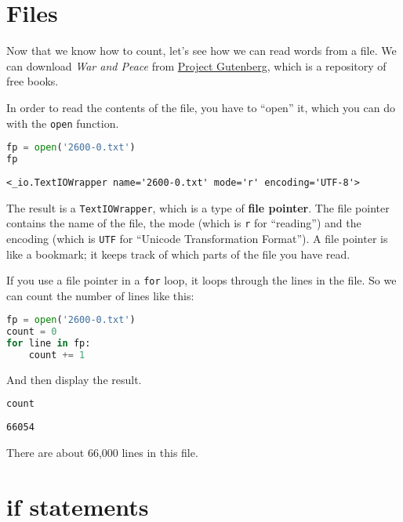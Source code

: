 \hypertarget{files}{%
\section{Files}\label{files}}

Now that we know how to count, let's see how we can read words from a
file. We can download \emph{War and Peace} from
\href{https://www.gutenberg.org}{Project Gutenberg}, which is a
repository of free books.

In order to read the contents of the file, you have to ``open'' it,
which you can do with the \passthrough{\lstinline!open!} function.

\begin{lstlisting}[language=Python,style=source]
fp = open('2600-0.txt')
fp
\end{lstlisting}

\begin{lstlisting}[style=output]
<_io.TextIOWrapper name='2600-0.txt' mode='r' encoding='UTF-8'>
\end{lstlisting}

The result is a \passthrough{\lstinline!TextIOWrapper!}, which is a type
of \textbf{file pointer}. The file pointer contains the name of the
file, the mode (which is \passthrough{\lstinline!r!} for ``reading'')
and the encoding (which is \passthrough{\lstinline!UTF!} for ``Unicode
Transformation Format''). A file pointer is like a bookmark; it keeps
track of which parts of the file you have read.

If you use a file pointer in a \passthrough{\lstinline!for!} loop, it
loops through the lines in the file. So we can count the number of lines
like this:

\begin{lstlisting}[language=Python,style=source]
fp = open('2600-0.txt')
count = 0
for line in fp:
    count += 1
\end{lstlisting}

And then display the result.

\begin{lstlisting}[language=Python,style=source]
count
\end{lstlisting}

\begin{lstlisting}[style=output]
66054
\end{lstlisting}

There are about 66,000 lines in this file.

\hypertarget{if-statements}{%
\section{if statements}\label{if-statements}}

